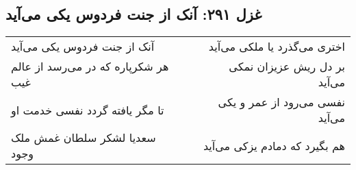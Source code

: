\begin{center}
\section*{غزل ۲۹۱: آنک از جنت فردوس یکی می‌آید}
\label{sec:291}
\begin{longtable}{l p{0.5cm} r}
آنک از جنت فردوس یکی می‌آید
&&
اختری می‌گذرد یا ملکی می‌آید
\\
هر شکرپاره که در می‌رسد از عالم غیب
&&
بر دل ریش عزیزان نمکی می‌آید
\\
تا مگر یافته گردد نفسی خدمت او
&&
نفسی می‌رود از عمر و یکی می‌آید
\\
سعدیا لشکر سلطان غمش ملک وجود
&&
هم بگیرد که دمادم یزکی می‌آید
\\
\end{longtable}
\end{center}
